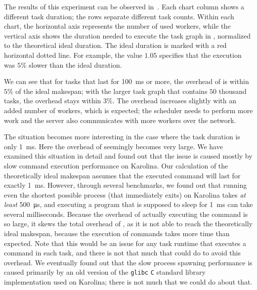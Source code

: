 The results of this experiment can be observed in~. Each chart column shows
a different task duration; the rows separate different task counts. Within each chart, the
horizontal axis represents the number of used workers, while the vertical axis shows the duration
needed to execute the task graph in \hyperqueue{}, normalized to the theoretical ideal
duration. The ideal duration is marked with a red horizontal dotted line. For example, the value
$1.05$ specifies that the \hyperqueue{} execution was
$5\%$ slower than the ideal duration.

We can see that for tasks that last for \SI{100}{\milli\second} or more, the overhead of
\hyperqueue{} is within $5\%$ of the ideal makespan; with the larger
task graph that contains $50$ thousand tasks, the overhead stays within
$3\%$. The overhead increases slightly with an added number of workers, which is
expected; the scheduler needs to perform more work and the server also communicates with more
workers over the network.

The situation becomes more interesting in the case where the task duration is only
\SI{1}{\milli\second}. Here the overhead of \hyperqueue{} seemingly becomes very large.
We have examined this situation in detail and found out that the issue is caused mostly by slow
command execution performance on Karolina. Our calculation of the theoretically ideal makespan
assumes that the executed command will last for exactly \SI{1}{\milli\second}. However, through
several benchmarks, we found out that running even the shortest possible process (that
immediately exits) on Karolina
takes \emph{at least}
\SI{500}{\micro\second}, and executing a program that is supposed to sleep for
\SI{1}{\milli\second} can take several milliseconds. Because the overhead of actually executing
the command is so large, it skews the total overhead of \hyperqueue{}, as it is not able
to reach the theoretically ideal makespan, because the execution of commands takes more time than
expected. Note that this would be an issue for any task runtime that executes a command in each
task, and there is not that much that \hyperqueue{} could do to avoid this overhead. We
eventually found out that the slow process spawning performance is caused primarily by an old
version of the \texttt{glibc} \texttt{C} standard library implementation used on Karolina; there
is not much that we could do about that.


